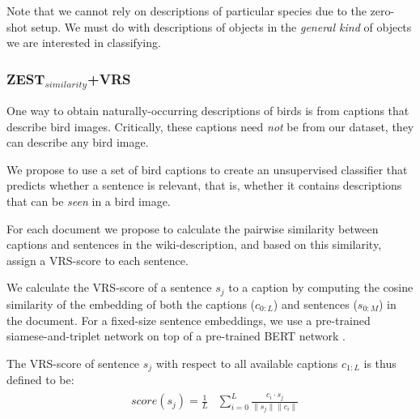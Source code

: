\documentclass[11pt,a4paper]{article}
\newcommand\gal[1]{\textcolor{bright}{\textbf{GAL:} #1 }}
\begin{document}
Note that we cannot rely on descriptions of particular species due to the zero-shot setup. We must do with descriptions of objects in the {\em general kind} %
of objects we are interested in classifying. 

\subsubsection{ZEST$_{similarity}$+VRS}
One way to obtain naturally-occurring descriptions of birds is from captions that describe bird images. Critically, these captions need {\em not} be from our dataset, they can describe any bird image. 

We propose to use a set of bird captions to create an unsupervised classifier that predicts whether a sentence is relevant, that is, whether it contains descriptions that can be {\em seen} in a bird image.

For each document we propose to calculate the pairwise similarity between captions and sentences in the wiki-description, and based on this similarity, assign a VRS-score to each sentence.



We calculate the VRS-score of a sentence $s_j$ to a caption by computing the cosine similarity of the embedding of both the captions ($c_{0:L}$) and sentences ($s_{0:M}$) in the document. For a fixed-size sentence embeddings, we use a pre-trained siamese-and-triplet network \citep{reimers2019sentence, Schroff_2015_CVPR} on top of a pre-trained BERT network \cite{devlin2019bert}.


The VRS-score of sentence $s_j$ with respect to all available captions  $c_{1:L}$ is thus defined to be:
\begin{equation}
\begin{aligned}
\begin{split}
\label{eq:score}
&score(s_j)= \frac{1}{L}
&\sum_{i=0}^{L} \frac{c_i\cdot s_j}{\| s_j\|\| c_i\| }
\end{split}
\end{aligned}
\end{equation}
\end{document}
